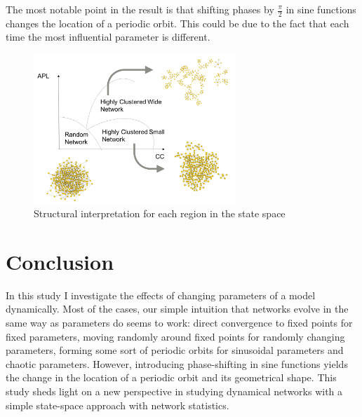 \documentclass{article}
\begin{document}
  The most notable point in the result is that shifting phases by $\frac{\pi}{2}$ in sine functions changes the location of a periodic orbit. This could be due to the fact that each time the most influential parameter is different. 
     
 \begin{figure}[h]
  \centering
  \includegraphics[width=3in]{figs/diagram.png}
  \caption{Structural interpretation for each region in the state space}
  \label{q2}
\end{figure}

\section{Conclusion}
In this study I investigate the effects of changing parameters of a model dynamically. Most of the cases, our simple intuition that networks evolve in the same way as parameters do seems to work: direct convergence to fixed points for fixed parameters, moving randomly around fixed points for randomly changing parameters, forming some sort of periodic orbits for sinusoidal parameters and chaotic parameters. However, introducing phase-shifting in sine functions yields the change in the location of a periodic orbit and its geometrical shape. This study sheds light on a new perspective in studying dynamical networks with a simple state-space approach with network statistics.


 
\end{document}
